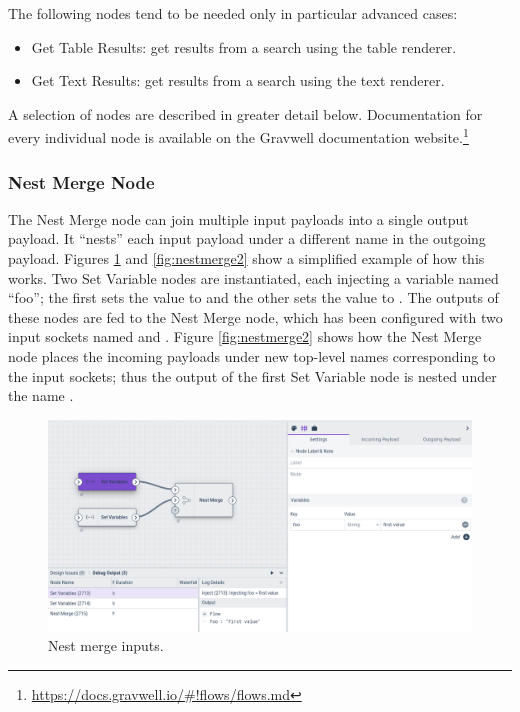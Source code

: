 The following nodes tend to be needed only in particular advanced cases:

\begin{itemize}
\item Get Table Results: get results from a search using the table renderer.
\item Get Text Results: get results from a search using the text renderer.
\end{itemize}

A selection of nodes are described in greater detail below. Documentation for every individual node is available on the Gravwell documentation website.\footnote{\href{https://docs.gravwell.io/\#!flows/flows.md}{https://docs.gravwell.io/\#!flows/flows.md}}

\subsubsection{Nest Merge Node}
The Nest Merge node can join multiple input payloads into a single output payload. It ``nests'' each input payload under a different name in the outgoing payload. Figures \ref{fig:nestmerge1} and \ref{fig:nestmerge2} show a simplified example of how this works. Two Set Variable nodes are instantiated, each injecting a variable named ``foo''; the first sets the value to  and the other sets the value to . The outputs of these nodes are fed to the Nest Merge node, which has been configured with two input sockets named  and . Figure \ref{fig:nestmerge2} shows how the Nest Merge node places the incoming payloads under new top-level names corresponding to the input sockets; thus the  output of the first Set Variable node is nested under the name .

\begin{figure}
	\includegraphics[width=0.85\linewidth]{images/nestmerge1.png}
	\caption{Nest merge inputs.}
	\label{fig:nestmerge1}
\end{figure}


